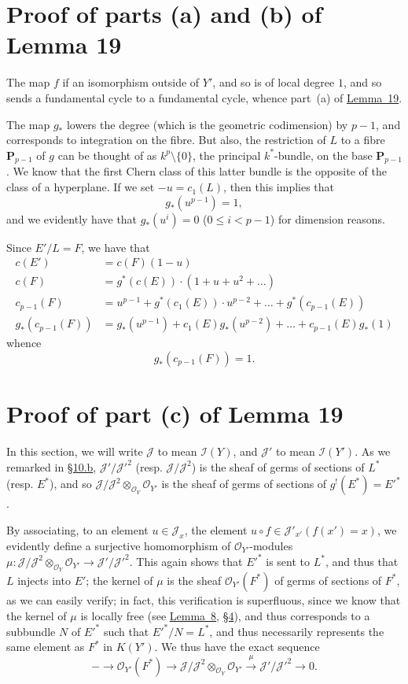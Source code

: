 \documentclass{article}
\newcommand{\scr}[1]{{\mathscr{#1}}}
\newcommand{\PP}{\mathbf{P}}
\renewcommand{\leq}{\leqslant}
\newcommand{\oldpage}[1]{\marginpar{\footnotesize$\Big\vert$ \textit{p.~#1}}}
\begin{document}
\section{Proof of parts (a) and (b) of Lemma 19}
\label{section14}

The map $f$ if an isomorphism outside of $Y'$, and so is of local degree $1$, and so sends a fundamental cycle to a fundamental cycle, whence part~(a) of \hyperref[lemma19]{Lemma~19}.

The map $g_*$ lowers the degree (which is the geometric codimension) by $p-1$, and corresponds to integration on the fibre.
But also, the restriction of $L$ to a fibre $\PP_{p-1}$ of $g$ can be thought of as $k^p\setminus\{0\}$, the principal $k^*$-bundle, on the base $\PP_{p-1}$.
We know that the first Chern class of this latter bundle is the opposite of the class of a hyperplane.
If we
\oldpage{130}
set $-u=c_1(L)$, then this implies that
\[
  g_*(u^{p-1}) = 1,
\]
and we evidently have that $g_*(u^i)=0$ ($0\leq i<p-1$) for dimension reasons.

Since $E'/L=F$, we have that
\begin{align*}
  c(E') &= c(F)(1-u)
\\c(F) &= g^*(c(E))\cdot(1+u+u^2+\ldots)
\\c_{p-1}(F) &= u^{p-1}+g^*(c_1(E))\cdot u^{p-2} +\ldots+ g^*(c_{p-1}(E))
\\g_*(c_{p-1}(F)) &= g_*(u^{p-1})+c_1(E)g_*(u^{p-2}) +\ldots+ c_{p-1}(E)g_*(1)
\end{align*}
whence
\[
  g_*(c_{p-1}(F)) = 1.
\]


\section{Proof of part (c) of Lemma 19}
\label{section15}

In this section, we will write $\scr{J}$ to mean $\scr{I}(Y)$, and $\scr{J}'$ to mean $\scr{I}(Y')$.
As we remarked in \hyperref[subsection10b]{\S10.b}, $\scr{J}'/\scr{J}'^2$ (resp. $\scr{J}/\scr{J}^2$) is the sheaf of germs of sections of $L^*$ (resp. $E^*$), and so $\scr{J}/\scr{J}^2\otimes_{\scr{O}_Y}\scr{O}_{Y'}$ is the sheaf of germs of sections of $g^!(E^*)=E'^*$.

By associating, to an element $u\in\scr{J}_x$, the element $u\circ f\in\scr{J}'_{x'}(f(x')=x)$, we evidently define a surjective homomorphism of $\scr{O}_{Y'}$-modules $\mu\colon\scr{J}/\scr{J}^2\otimes_{\scr{O}_Y}\scr{O}_{Y'}\to\scr{J}'/\scr{J}'^2$.
This again shows that $E'^*$ is sent to $L^*$, and thus that $L$ injects into $E'$;
the kernel of $\mu$ is the sheaf $\scr{O}_{Y'}(F^*)$ of germs of sections of $F^*$, as we can easily verify;
in fact, this verification is superfluous, since we know that the kernel of $\mu$ is locally free (see \hyperref[lemma8]{Lemma~8}, \hyperref[section4]{\S4}), and thus corresponds to a subbundle $N$ of $E'^*$ such that $E'^*/N=L^*$, and thus necessarily represents the same element as $F^*$ in $K(Y')$.
We thus have the exact sequence
\[
\label{section15equation1}
  - \to \scr{O}_{Y'}(F^*) \to \scr{J}/\scr{J}^2\otimes_{\scr{O}_Y}\scr{O}_{Y'} \xrightarrow{\mu} \scr{J}'/\scr{J}'^2 \to 0.
  \tag{1}
\]
\end{document}
